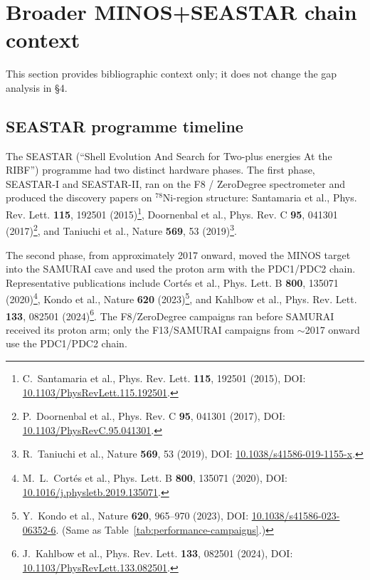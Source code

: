 \documentclass[a4paper, 11pt]{article}
\begin{document}
\section{Broader MINOS+SEASTAR chain context}
This section provides bibliographic context only; it does not change the gap analysis in §4.

\subsection{SEASTAR programme timeline}
The SEASTAR (``Shell Evolution And Search for Two-plus energies At the RIBF'') programme had two distinct hardware phases. The first phase, SEASTAR-I and SEASTAR-II, ran on the F8 / ZeroDegree spectrometer and produced the discovery papers on $^{78}$Ni-region structure: Santamaria et al., Phys. Rev. Lett. \textbf{115}, 192501 (2015)\footnote{\label{fn:santamaria2015prl}C.~Santamaria et al., Phys. Rev. Lett. \textbf{115}, 192501 (2015), DOI: \href{https://doi.org/10.1103/PhysRevLett.115.192501}{10.1103/PhysRevLett.115.192501}.}, Doornenbal et al., Phys. Rev. C \textbf{95}, 041301 (2017)\footnote{\label{fn:doornenbal2017}P.~Doornenbal et al., Phys. Rev. C \textbf{95}, 041301 (2017), DOI: \href{https://doi.org/10.1103/PhysRevC.95.041301}{10.1103/PhysRevC.95.041301}.}, and Taniuchi et al., Nature \textbf{569}, 53 (2019)\footnote{\label{fn:taniuchi2019}R.~Taniuchi et al., Nature \textbf{569}, 53 (2019), DOI: \href{https://doi.org/10.1038/s41586-019-1155-x}{10.1038/s41586-019-1155-x}.}.

The second phase, from approximately 2017 onward, moved the MINOS target into the SAMURAI cave and used the proton arm with the PDC1/PDC2 chain. Representative publications include Cortés et al., Phys. Lett. B \textbf{800}, 135071 (2020)\footnote{\label{fn:cortes2020}M.~L.~Cortés et al., Phys. Lett. B \textbf{800}, 135071 (2020), DOI: \href{https://doi.org/10.1016/j.physletb.2019.135071}{10.1016/j.physletb.2019.135071}.}, Kondo et al., Nature \textbf{620} (2023)\footnote{\label{fn:kondo2023ref}Y.~Kondo et al., Nature \textbf{620}, 965--970 (2023), DOI: \href{https://doi.org/10.1038/s41586-023-06352-6}{10.1038/s41586-023-06352-6}. (Same as Table~\ref{tab:performance-campaigns}.)}, and Kahlbow et al., Phys. Rev. Lett. \textbf{133}, 082501 (2024)\footnote{\label{fn:kahlbow2024prlref}J.~Kahlbow et al., Phys. Rev. Lett. \textbf{133}, 082501 (2024), DOI: \href{https://doi.org/10.1103/PhysRevLett.133.082501}{10.1103/PhysRevLett.133.082501}.}. The F8/ZeroDegree campaigns ran before SAMURAI received its proton arm; only the F13/SAMURAI campaigns from $\sim$2017 onward use the PDC1/PDC2 chain.
\end{document}
